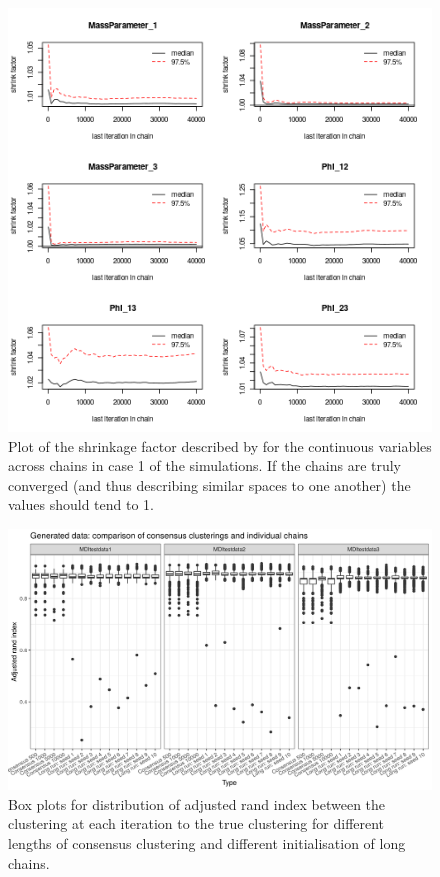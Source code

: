 \documentclass[12pt]{article} %
\begin{document}
	\begin{figure}[!htb]
			\centering
			\includegraphics[scale=0.65]{Images/Gen_data/Case_1/Gelman_plot.png}
			\caption{Plot of the shrinkage factor described by \citet{GelmanInferenceIterativeSimulation1992} for the continuous variables across chains in case 1 of the simulations. If the chains are truly converged (and thus describing similar spaces to one another) the values should tend to 1.}
			\label{fig:gen_data_case_1_gelman_plot}
		\end{figure}

	\newpage
	
		\begin{figure}
			\centering
			\includegraphics[scale=0.9]{Images/Gen_data/Case_1/box_plot_ari_true_clustering.png}
			\caption{Box plots for distribution of adjusted rand index between the clustering at each iteration to the true clustering for different lengths of consensus clustering and different initialisation of long chains.}
			\label{fig:gen_data_case_1_boxplot}
		\end{figure}
		
\end{document}
